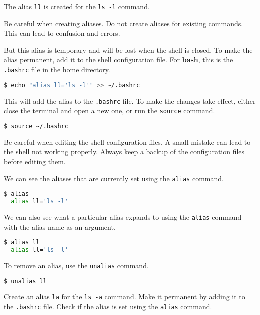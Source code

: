 The alias \lstinline|ll| is created for the \lstinline|ls -l| command.

\begin{warn}
  Be careful when creating aliases.
  Do not create aliases for existing commands.
  This can lead to confusion and errors.
\end{warn}

But this alias is temporary and will be lost when the shell is closed.
To make the alias permanent, add it to the shell configuration file.
For \textbf{bash}, this is the \lstinline|.bashrc| file in the home directory.

\begin{lstlisting}[language=bash]
  $ echo "alias ll='ls -l'" >> ~/.bashrc
\end{lstlisting}

This will add the alias to the \lstinline|.bashrc| file.
To make the changes take effect, either close the terminal and open a new one, or run the \lstinline|source| command.

\begin{lstlisting}[language=bash]
  $ source ~/.bashrc
\end{lstlisting}


\begin{warn}
  Be careful when editing the shell configuration files.
  A small mistake can lead to the shell not working properly.
  Always keep a backup of the configuration files before editing them.
\end{warn}

We can see the aliases that are currently set using the \lstinline|alias| command.

\begin{lstlisting}[language=bash]
  $ alias
  alias ll='ls -l'
\end{lstlisting}

We can also see what a particular alias expands to using the \lstinline|alias| command with the alias name as an argument.

\begin{lstlisting}[language=bash]
  $ alias ll
  alias ll='ls -l'
\end{lstlisting}

To remove an alias, use the \lstinline|unalias| command.

\begin{lstlisting}[language=bash]
  $ unalias ll
\end{lstlisting}

\begin{exercise}
  Create an alias \lstinline|la| for the \lstinline|ls -a| command.
  Make it permanent by adding it to the \lstinline|.bashrc| file.
  Check if the alias is set using the \lstinline|alias| command.
\end{exercise}

